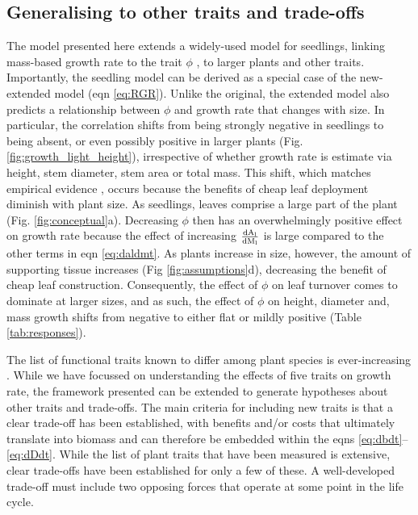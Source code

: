 \documentclass[9pt,twocolumn,twoside,lineno]{pnas-new}
\newcommand{\ud}{\ensuremath{\rm{d}}}
\begin{document}
\subsection{Generalising to other traits and trade-offs}

The model presented here extends a widely-used model for seedlings, linking mass-based growth rate to the trait $\phi$ \citep{Lambers-1992, Wright-2000}, to larger plants and other traits. Importantly, the seedling model can be derived as a special case of the new-extended model (eqn \ref{eq:RGR}). Unlike the original, the extended model also predicts a relationship between $\phi$ and growth rate that changes with size. In particular, the correlation shifts from being strongly negative in seedlings to being absent, or even possibly positive in larger plants (Fig. \ref{fig:growth_light_height}), irrespective of whether growth rate is estimate via height, stem diameter, stem area or total mass. This shift, which matches empirical evidence \citep{Poorter-2008, Wright-2010, Herault-2011, Paine-2015, Gibert-2016}, occurs because the benefits of cheap leaf deployment diminish with plant size. As seedlings, leaves comprise a large part of the plant (Fig. \ref{fig:conceptual}a). Decreasing $\phi$ then has an overwhelmingly positive effect on growth rate because the effect of increasing $\frac{\ud A_{\rm l}}{\ud M_{\rm l}}$ is large compared to the other terms in eqn \ref{eq:daldmt}. As plants increase in size, however, the amount of supporting tissue increases (Fig \ref{fig:assumptions}d), decreasing the benefit of cheap leaf construction. Consequently, the effect of $\phi$ on leaf turnover comes to dominate at larger sizes, and as such, the effect of $\phi$ on height, diameter and, mass growth shifts from negative to either flat or mildly positive  (Table \ref{tab:responses}).

The list of functional traits known to differ among plant species is ever-increasing \citep{Perez-2013}. While we have focussed on understanding the effects of five traits on growth rate, the framework presented can be extended to generate hypotheses about other traits and trade-offs. The main criteria for including new traits is that a clear trade-off has been established, with benefits and/or costs that ultimately translate into biomass and can therefore be embedded within the eqns \ref{eq:dbdt}--\ref{eq:dDdt}. While the list of plant traits that have been measured is extensive, clear trade-offs have been established for only a few of these. A well-developed trade-off must include two opposing forces that operate at some point in the life cycle.
\end{document}
